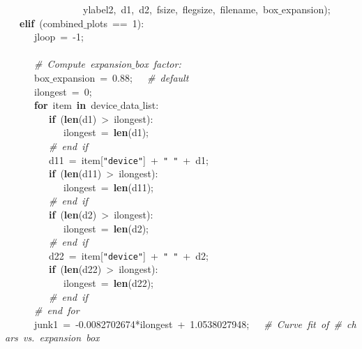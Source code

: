 \mbox{}\ \ \ \ \ \ \ \ \ \ \ \ \ \ \ \ ylabel2,\ d1,\ d2,\ fsize,\ flegsize,\ filename,\ box$\_$expansion); \\
\mbox{}\ \ \ \textbf{elif}\ (combined$\_$plots\ ==\ 1): \\
\mbox{}\ \ \ \ \ \ jloop\ =\ -1; \\
\mbox{}\ \ \ \ \ \  \\
\mbox{}\ \ \ \ \ \ \textit{\#\ Compute\ expansion$\_$box\ factor:} \\
\mbox{}\ \ \ \ \ \ box$\_$expansion\ =\ 0.88;\ \ \ \textit{\#\ default} \\
\mbox{}\ \ \ \ \ \ ilongest\ =\ 0; \\
\mbox{}\ \ \ \ \ \ \textbf{for}\ item\ \textbf{in}\ device$\_$data$\_$list: \\
\mbox{}\ \ \ \ \ \ \ \ \ \textbf{if}\ (\textbf{len}(d1)\ \textgreater{}\ ilongest): \\
\mbox{}\ \ \ \ \ \ \ \ \ \ \ \ ilongest\ =\ \textbf{len}(d1); \\
\mbox{}\ \ \ \ \ \ \ \ \ \textit{\#\ end\ if} \\
\mbox{}\ \ \ \ \ \ \ \ \ d11\ =\ item[\texttt{"{}device"{}}]\ +\ \texttt{"{}\ "{}}\ +\ d1; \\
\mbox{}\ \ \ \ \ \ \ \ \ \textbf{if}\ (\textbf{len}(d11)\ \textgreater{}\ ilongest): \\
\mbox{}\ \ \ \ \ \ \ \ \ \ \ \ ilongest\ =\ \textbf{len}(d11); \\
\mbox{}\ \ \ \ \ \ \ \ \ \textit{\#\ end\ if} \\
\mbox{}\ \ \ \ \ \ \ \ \ \textbf{if}\ (\textbf{len}(d2)\ \textgreater{}\ ilongest): \\
\mbox{}\ \ \ \ \ \ \ \ \ \ \ \ ilongest\ =\ \textbf{len}(d2); \\
\mbox{}\ \ \ \ \ \ \ \ \ \textit{\#\ end\ if} \\
\mbox{}\ \ \ \ \ \ \ \ \ d22\ =\ item[\texttt{"{}device"{}}]\ +\ \texttt{"{}\ "{}}\ +\ d2; \\
\mbox{}\ \ \ \ \ \ \ \ \ \textbf{if}\ (\textbf{len}(d22)\ \textgreater{}\ ilongest): \\
\mbox{}\ \ \ \ \ \ \ \ \ \ \ \ ilongest\ =\ \textbf{len}(d22); \\
\mbox{}\ \ \ \ \ \ \ \ \ \textit{\#\ end\ if} \\
\mbox{}\ \ \ \ \ \ \textit{\#\ end\ for} \\
\mbox{}\ \ \ \ \ \ junk1\ =\ -0.0082702674*ilongest\ +\ 1.0538027948;\ \ \ \textit{\#\ Curve\ fit\ of\ \#\ chars\ vs.\ expansion\ box} \\
